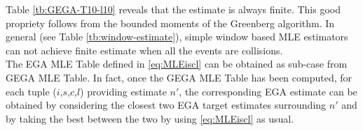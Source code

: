 \documentclass[11pt,a4paper,twoside,openright]{book}
\begin{document}
\begin{table}[htbp]
\centering
{}
\caption{\emph{GEGA}: Possible estimates when $T=10$ and $l=10$.}
\label{tb:GEGA-T10-l10}
\end{table}

Table \ref{tb:GEGA-T10-l10} reveals that the estimate is always finite. This good propriety  follows from the bounded moments of the Greenberg algorithm. In general (see Table \ref{tb:window-estimate}), simple window based MLE estimators can not achieve finite estimate when all the events are collisions.\\

The EGA MLE Table defined in \eqref{eq:MLEiscl} can be obtained as sub-case from GEGA MLE Table. In fact, once the GEGA MLE Table has been computed,  for each tuple ($i$,$s$,$c$,$l$) providing estimate $n'$, the corresponding EGA estimate can be obtained by considering the closest two EGA target estimates surrounding $n'$ and by taking the best between the two by using \eqref{eq:MLEiscl} as usual.\\
\end{document}
